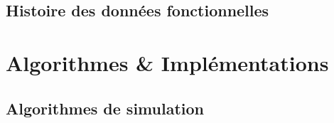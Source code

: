 \section{ Histoire des données fonctionnelles }

\pagebreak
% 


\chapter{Algorithmes \& Implémentations}

\label{annexe:code}
\section{Algorithmes de simulation}



%

